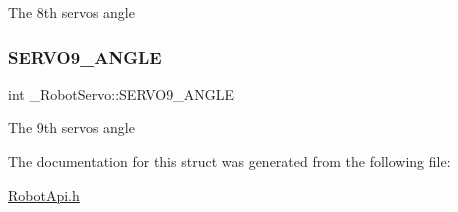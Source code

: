 The 8th servo\textquotesingle{}s angle \mbox{\label{struct__RobotServo_a7c262cfcbbf1246556a7f7a23a35275f}} 
\subsubsection{\texorpdfstring{S\+E\+R\+V\+O9\+\_\+\+A\+N\+G\+LE}{SERVO9\_ANGLE}}
{\footnotesize\ttfamily int \+\_\+\+Robot\+Servo\+::\+S\+E\+R\+V\+O9\+\_\+\+A\+N\+G\+LE}

The 9th servo\textquotesingle{}s angle 

The documentation for this struct was generated from the following file\+:\begin{DoxyCompactItemize}
\item 
\hyperlink{RobotApi_8h}{Robot\+Api.\+h}\end{DoxyCompactItemize}
